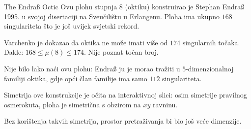 \begin{surferPage}{The Endraß Octic}
		Ovu plohu stupnja $8$ (oktiku) konstruirao je Stephan Endraß 1995. u svojoj disertaciji
		na Sveu\v{c}ili\v{s}tu u Erlangenu.
		Ploha ima ukupno $168$ singulariteta \v{s}to je jo\v{s} uvijek svjetski rekord.
  
		Varchenko je dokazao da oktika ne mo\v{z}e imati vi\v{s}e 
		od $174$ singularnih to\v{c}aka.
		Dakle: $168 \le \mu(8) \le 174$.
		Nije poznat to\v{c}an broj.

		Nije bilo lako na\'{c}i ovu plohu: Endraß ju je morao tra\v{z}iti u 
		$5$-dimenzionalnoj familiji oktika, gdje op\'{c}i \v{c}lan familije ima 
		samo $112$ singulariteta.

		Simetrija ove konstrukcije je o\v{c}ita na interaktivnoj slici:
		osim simetrije pravilnog osmerokuta, ploha je simetri\v{c}na s obzirom
		na $xy$ ravninu.

		Bez kori\v{s}tenja takvih simetrija, prostor pretra\v{z}ivanja bi bio
		jo\v{s} ve\'{c}e dimenzije.
\end{surferPage}
